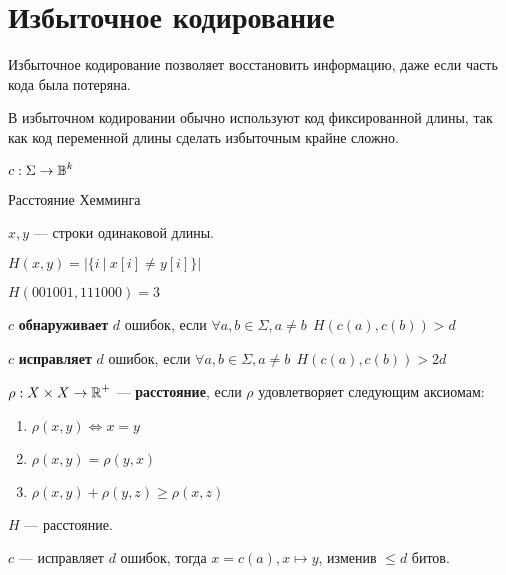 

\cfoot{}


\section{Избыточное кодирование}

Избыточное кодирование позволяет восстановить информацию, даже если часть кода была потеряна.

В избыточном кодировании обычно используют код фиксированной длины, так как код переменной длины сделать избыточным крайне сложно.

$c: \Sigma \to \operatorname*{\mathbb{B}}^k$

\begin{definition}
    Расстояние Хемминга

    $x, y$ --- строки одинаковой длины.

    $H(x,y)=|\{i\ |\ x[i]\not = y[i]\}|$

    $H(001001, 111000)=3$
\end{definition}

\begin{definition}
    $c$ {\bf обнаруживает} $d$ ошибок, если $\forall a,b\in\Sigma, a\not=b \ \ H(c(a),c(b)) > d$
\end{definition}

\begin{definition}
    $c$ {\bf исправляет} $d$ ошибок, если $\forall a,b\in\Sigma, a\not=b \ \ H(c(a),c(b)) > 2d$
\end{definition}

\begin{definition}
    $\rho : X\times X\to \operatorname*{\mathbb{R}}^+$ --- {\bf расстояние}, если $\rho$ удовлетворяет следующим аксиомам:
    \begin{enumerate}
        \item $\rho(x,y)\Leftrightarrow x=y$
        \item $\rho(x,y) = \rho(y,x)$
        \item $\rho(x,y) + \rho(y,z) \geq \rho(x,z)$
    \end{enumerate}
\end{definition}

\begin{lemma}
    $H$ --- расстояние.
\end{lemma}

$c$ --- исправляет $d$ ошибок, тогда $x=c(a), x\mapsto y$, изменив $\leq d$ битов.

